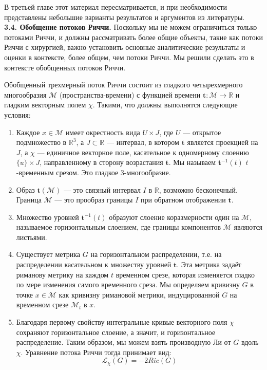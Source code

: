 В третьей главе этот материал пересматривается, и при 
необходимости представлены небольшие варианты результатов и 
аргументов из литературы.\\

\textbf{3.4. Обобщение потоков Риччи.} Поскольку мы не 
можем ограничиться только потоками Риччи, и должны 
рассматривать более общие объекты, такие как потоки Риччи 
с хирургией, важно установить основные аналитические 
результаты и оценки в контексте, более общем, чем потоки 
Риччи. Мы решили сделать это в контексте обобщенных 
потоков Риччи.

Обобщенный трехмерный поток Риччи состоит из гладкого 
четырехмерного многообразия $\mathcal{M}$ (пространства-времени) 
с функцией времени $\textbf{t}:\mathcal{M} \rightarrow \mathbb{R}$ 
и гладким векторным полем $\chi$. 
Такими, что должны выполнятся следующие условия:
\begin{enumerate}
    \item Каждое $x\in \mathcal{M}$ имеет окрестность вида $U \times J$, где 
    $U$ — открытое подмножество в $\mathbb{R}^3$, а $J\subset \mathbb{R}$ — интервал, 
    в котором $\textbf{t}$ является проекцией на $J$, а $\chi$ — единичное 
    векторное поле, касательное к одномерному слоению 
    $\{ u\} \times J$, направленному в сторону возрастания $\textbf{t}$.
    Мы называем $\textbf{t}^{-1}(t)$ $t$-временным срезом. Это гладкое 3-многообразие.
    \item Образ $\textbf{t}(\mathcal{M})$ — это связный интервал $I$ в $\mathbb{R}$, возможно бесконечный. 
    Граница $\mathcal{M}$ — это прообраз границы $I$ при обратном отображении $\textbf{t}$.
    \item Множество уровней  $\textbf{t}^{-1}(t)$  образуют слоение коразмерности один 
    на $\mathcal{M}$, называемое горизонтальным слоением, где границы компонентов 
    $\mathcal{M}$ являются листьями.
    \item Существует метрика $G$ на горизонтальном распределении, 
    т.е. на распределении касательном к множеству уровней $\textbf{t}$.
    Эта метрика задаёт риманову метрику на каждом $t$ временном срезе, 
    которая изменяется гладко по мере изменения самого временного среза.
    Мы определяем кривизну $G$ в точке $x \in \mathcal{M}$ как кривизну 
    римановой метрики, индуцированной $G$ на временном срезе $\mathcal{M}_t$ в $x$.
    \item Благодаря первому свойству интегральные кривые векторного 
    поля $ \chi $ сохраняют горизонтальное слоение, а значит, и горизонтальное 
    распределение. Таким образом, мы можем взять производную Ли от $ G $ 
    вдоль $ \chi $. Уравнение потока Риччи тогда принимает вид:
    \[
    \mathcal{L}_{\chi}(G)=-2Ric(G)
    \]
\end{enumerate}

